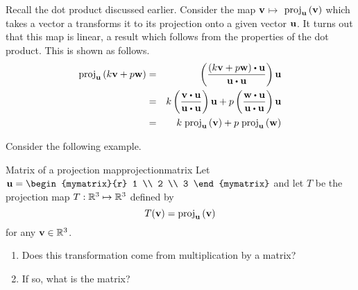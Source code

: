 Recall the dot product discussed earlier. Consider the map ${\bf v}$\textbf{$\mapsto $}
$\mbox{proj}_{{\bf u}}\left({\bf v}\right) $ which takes a vector a transforms it to its projection onto a given vector ${\bf u}$. It turns out that
this map is linear, a result which follows from the properties of the
dot product. This is shown as follows.
\begin{eqnarray*}
\func{proj}_{\vect{u}}\tup{k \vect{v}+ p \vect{w}}
&=&\tup{\vspace{0.05in}\frac{(k \vect{v}+ p \vect{w})\dotprod \vect{u}}{
\vect{u}\dotprod \vect{u}}} \vect{u} \\
&=& k  \tup{\vspace{0.05in}\frac{
\vect{v}\dotprod \vect{u}}{\vect{u}\dotprod \vect{u}}} \vect{u}+p \tup{\vspace{
0.05in}\frac{\vect{w}\dotprod \vect{u}}{\vect{u}\dotprod \vect{u}}} \vect{u} \\
&=& k \; \func{proj}_{\vect{u}}\tup{\vect{v}} +p \; \func{proj}
_{\vect{u}}\tup{\vect{w}} 
\end{eqnarray*}

Consider the following example.

\begin{example}{Matrix of a projection map}{projectionmatrix}
Let $\vect{u} = \begin{mymatrix}{r}
1 \\
2 \\
3
\end{mymatrix}$ and let $T$ be the projection map $T: \mathbb{R}^3 \mapsto \mathbb{R}^3$ defined by 
\[
T({\bf v}) = \mbox{proj}_{{\bf u}}\left({\bf v}\right)
\]
for any ${\bf v} \in \mathbb{R}^3$.  
\begin{enumerate}
\item Does this transformation come from
multiplication by a matrix?
\item If so, what is the matrix?
\end{enumerate}
\end{example}

